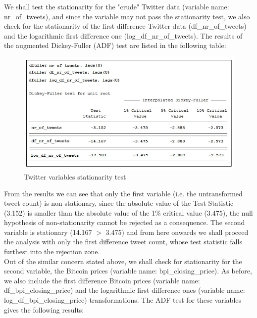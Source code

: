 \documentclass[a4paper,american,12pt]{article}
\begin{document}
\begin{spacing}{1.2}
We shall test the stationarity for the "crude" Twitter data (variable name: nr\_of\_tweets), and since the variable may not pass the stationarity test, we also check for the stationarity of the first difference Twitter data (df\_nr\_of\_tweets) and the logarithmic first difference one (log\_df\_nr\_of\_tweets). The results of the augmented Dickey-Fuller (ADF) test are listed in the following table:\\

\begin{figure}[H]
\centering
\includegraphics[scale=0.85]{stata_export_graphs/ADF_twitter_variables.png}
\caption{Twitter variables stationarity test}
\label{fig:3}
\end{figure}
	
From the results we can see that only the first variable (i.e. the untransformed tweet count) is non-stationary, since the absolute value of the Test Statistic (3.152) is smaller than the absolute value of the 1\% critical value (3.475), the null hypothesis of non-stationarity cannot be rejected as a consequence. The second variable is stationary (14.167 $>$ 3.475) and from here onwards we shall proceed the analysis with only the first difference tweet count, whose test statistic falls furthest into the rejection zone.\\

Out of the similar concern stated above, we shall check for stationarity for the second variable, the Bitcoin prices (variable name: bpi\_closing\_price). As before, we also include the first difference Bitcoin prices (variable name: df\_bpi\_closing\_price) and the logarithmic first difference ones (variable name: log\_df\_bpi\_closing\_price) transformations. The ADF test for these variables gives the following results:\\


\end{spacing}
\end{document}
